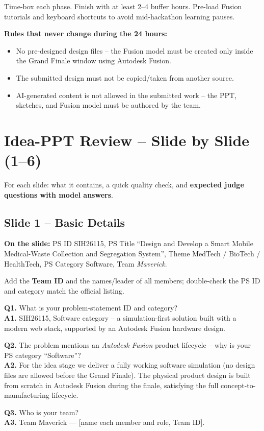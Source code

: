 \documentclass[11pt, a4paper]{article}
\begin{document}
\begin{flagbox}
Time-box each phase. Finish with at least 2--4 buffer hours. Pre-load Fusion
tutorials and keyboard shortcuts to avoid mid-hackathon learning pauses.
\end{flagbox}

\begin{warnbox}
\textbf{Rules that never change during the 24 hours:}
\begin{itemize}[leftmargin=1.6em, itemsep=1pt]
  \item No pre-designed design files -- the Fusion model must be created only
        inside the Grand Finale window using Autodesk Fusion.
  \item The submitted design must not be copied/taken from another source.
  \item AI-generated content is not allowed in the submitted work -- the PPT,
        sketches, and Fusion model must be authored by the team.
\end{itemize}
\end{warnbox}

\section{Idea-PPT Review -- Slide by Slide (1--6)}

For each slide: what it contains, a quick quality check, and
\textbf{expected judge questions with model answers}.

\subsection{Slide 1 -- Basic Details}
\textbf{On the slide:} PS ID SIH26115, PS Title ``Design and Develop a Smart
Mobile Medical-Waste Collection and Segregation System'', Theme
MedTech / BioTech / HealthTech, PS Category Software, Team \emph{Maverick}.
\begin{flagbox}
Add the \textbf{Team ID} and the names/leader of all members; double-check the
PS ID and category match the official listing.
\end{flagbox}

\begin{qabox}
\textbf{Q1.} What is your problem-statement ID and category?\\
\textbf{A1.} SIH26115, Software category -- a simulation-first solution built
with a modern web stack, supported by an Autodesk Fusion hardware design.

\textbf{Q2.} The problem mentions an \emph{Autodesk Fusion} product lifecycle --
why is your PS category ``Software''?\\
\textbf{A2.} For the idea stage we deliver a fully working software simulation
(no design files are allowed before the Grand Finale). The physical product
design is built from scratch in Autodesk Fusion during the finale, satisfying
the full concept-to-manufacturing lifecycle.

\textbf{Q3.} Who is your team?\\
\textbf{A3.} Team Maverick --- [name each member and role, Team ID].
\end{qabox}
\end{document}
